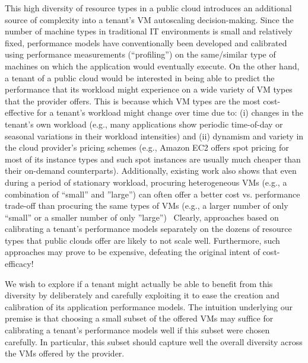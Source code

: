 This high diversity of resource types in a public cloud introduces an additional source of complexity into a tenant's %
VM autoscaling decision-making. Since the number of machine types in traditional IT environments is small and relatively fixed, performance models have conventionally been developed and calibrated using performance measurements (``profiling'') on the same/similar type of machines on which the application would eventually execute. On the other hand, a tenant of a public cloud would be interested in being able to predict the performance that its workload might experience on a wide variety of VM types that the provider offers. This is because which VM types are the most cost-effective for a tenant's workload might change over time due to: (i) changes in the tenant's own workload (e.g., many applications show periodic time-of-day or seasonal variations in their workload intensities) and (ii) dynamism and variety in the cloud provider's pricing schemes (e.g., Amazon EC2 offers spot pricing for most of its instance types and such spot instances are usually much cheaper than their on-demand counterparts). Additionally, existing work also shows that even during a period of stationary workload, procuring heterogeneous VMs (e.g., a combination of ``small'' and ''large'') can often offer a better cost vs. performance trade-off than procuring the same types of VMs (e.g., a larger number of only ``small'' or a smaller number of only ''large'')~\cite{Zhang15}
Clearly, approaches based on calibrating a tenant's performance models separately on the dozens of resource types that public clouds offer are likely to not scale well. Furthermore, such approaches may prove to be expensive, defeating the original intent of cost-efficacy!

We wish to explore if a tenant might actually be able to benefit from this diversity by deliberately and carefully exploiting it to ease the creation and calibration of its application performance models. The intuition underlying our premise is that choosing a small subset of the offered VMs may suffice for calibrating a tenant's performance models well if this subset were chosen carefully. In particular, this subset should capture well the overall diversity across the VMs offered by the provider. 



